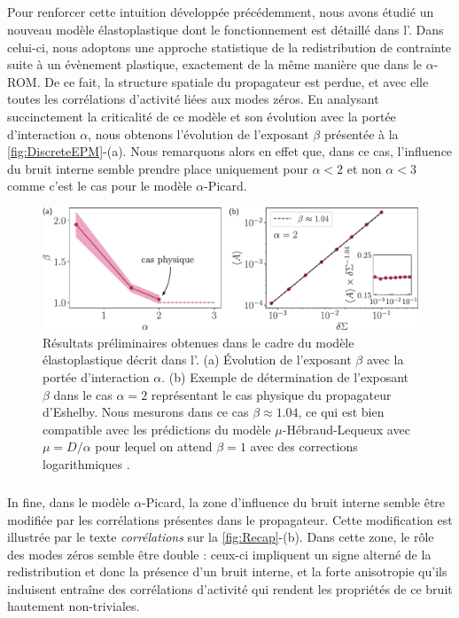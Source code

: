 \subparagraph{}Pour renforcer cette intuition développée précédemment, nous avons étudié un nouveau modèle élastoplastique dont le fonctionnement est détaillé dans l'. Dans celui-ci, nous adoptons une approche statistique de la redistribution de contrainte suite à un évènement plastique, exactement de la même manière que dans le $\alpha$-ROM. De ce fait, la structure spatiale du propagateur est perdue, et avec elle toutes les corrélations d'activité liées aux modes zéros. En analysant succinctement la criticalité de ce modèle et son évolution avec la portée d’interaction $\alpha$, nous obtenons l'évolution de l'exposant $\beta$ présentée à la \autoref{fig:DiscreteEPM}-(a). Nous remarquons alors en effet que, dans ce cas, l'influence du bruit interne semble prendre place uniquement pour $\alpha < 2$ et non $\alpha < 3$ comme c'est le cas pour le modèle $\alpha$-Picard.

\begin{figure}[h]
	\centering
	\includegraphics[width=\textwidth]{Chapitre5/Figures/DiscreteEPM.pdf}
	\caption{Résultats préliminaires obtenues dans le cadre du modèle élastoplastique décrit dans l'. (a) Évolution de l'exposant $\beta$ avec la portée d'interaction $\alpha$. (b) Exemple de détermination de l'exposant $\beta$ dans le cas $\alpha = 2$ représentant le cas physique du propagateur d'Eshelby. Nous mesurons dans ce cas $\beta \approx 1.04$, ce qui est bien compatible avec les prédictions du modèle $\mu$-Hébraud-Lequeux avec $\mu = D/\alpha$ pour lequel on attend $\beta = 1$ avec des corrections logarithmiques \cite{lin_microscopic_2018}.}
	\label{fig:DiscreteEPM}
\end{figure}

\subparagraph{}In fine, dans le modèle $\alpha$-Picard, la zone d'influence du bruit interne semble être modifiée par les corrélations présentes dans le propagateur. Cette modification est illustrée par le texte \textit{corrélations} sur la \autoref{fig:Recap}-(b). Dans cette zone, le rôle des modes zéros semble être double : ceux-ci impliquent un signe alterné de la redistribution et donc la présence d'un bruit interne, et la forte anisotropie qu'ils induisent entraîne des corrélations d'activité qui rendent les propriétés de ce bruit hautement non-triviales.

